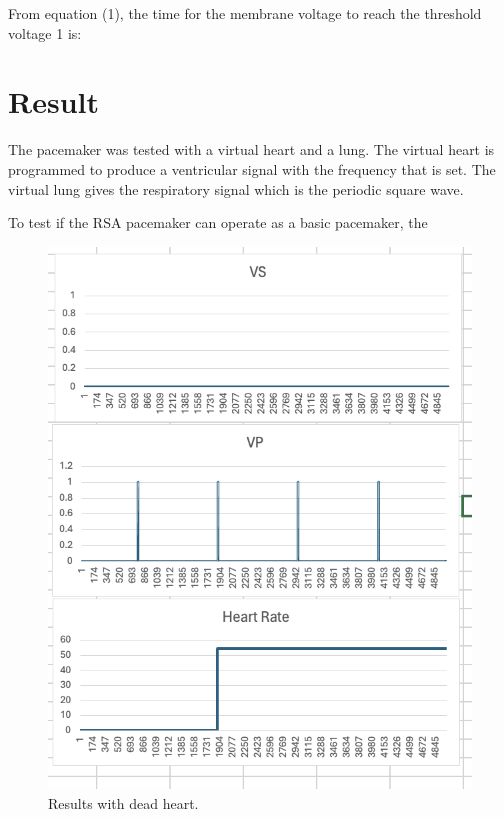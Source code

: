 \documentclass[conference]{IEEEtran}
\begin{document}
From equation (1), the time for the membrane voltage to reach the threshold voltage 1 is:



\section{Result}
The pacemaker was tested with a virtual heart and a lung. The virtual heart is programmed to produce a ventricular signal with the frequency that is set. The virtual lung gives the respiratory signal which is the periodic square wave.

To test if the RSA pacemaker can operate as a basic pacemaker, the 


\begin{figure}[htbp]
	\centerline{\includegraphics[scale=0.5]{./fig/result_dead.png}}
	\caption{Results with dead heart.}
	\label{lif}
\end{figure}
\end{document}
